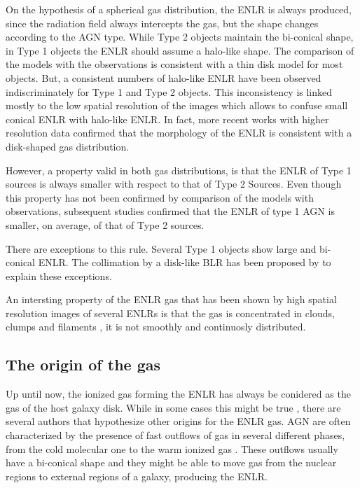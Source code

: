 \documentclass[../main.tex]{subfiles}
\begin{document}
On the hypothesis of a spherical gas distribution, the ENLR is always produced, since the radiation field always intercepts the gas, but the shape changes according to the AGN type.
While Type 2 objects maintain the bi-conical shape, in Type 1 objects the ENLR should assume a halo-like shape.
The comparison of the models with the observations is consistent with a thin disk model for most objects.
But, a consistent numbers of halo-like ENLR have been observed indiscriminately for Type 1 and Type 2 objects.
This inconsistency is linked mostly to the low spatial resolution of the images which allows to confuse small conical ENLR with halo-like ENLR.
In fact, more recent works with higher resolution data \citep[e.g.][]{Schmitt03,Schmitt03b,Fischer13} confirmed that the morphology of the ENLR is consistent with a disk-shaped gas distribution.

However, a property valid in both gas distributions, is that the ENLR of Type 1 sources is always smaller with respect to that of Type 2 Sources.
Even though this property has not been confirmed by \citet{Mulchaey96b} comparison of the models with observations, subsequent studies \citep[e.g.][]{Schmitt03b} confirmed that the ENLR of type 1 AGN is smaller, on average, of that of Type 2 sources.

There are exceptions to this rule.
Several Type 1 objects \citep[e.g. NGC 4151][]{Pogge89,Evans93} show large and bi-conical ENLR.
The collimation by a disk-like BLR has been proposed by \citet{Evans93} to explain these exceptions.

An intersting property of the ENLR gas that has been shown by high spatial resolution images of several ENLRs is that the gas is concentrated in clouds, clumps and filaments \citep[e.g.][]{Tadhunter89,Mulchaey96a,Mulchaey96b,Schmitt03,Schmitt03b}, it is not smoothly and continuosly distributed.

\subsection{The origin of the gas}

Up until now, the ionized gas forming the ENLR has always be conidered as the gas of the host galaxy disk.
While in some cases this might be true \citep[e.g.][]{Fischer17}, there are several authors that hypothesize other origins for the ENLR gas.
AGN are often characterized by the presence of fast outflows of gas in several different phases, from the cold molecular one to the warm ionized gas \citep{Baldwin87,Hutchings98,Crenshaw00,Crenshaw00b,Dasyra15,Morganti15,Morganti18}.
These outflows usually have a bi-conical shape \citep{Pogge88,Schmitt94,Fischer13} and they might be able to move gas from the nuclear regions to external regions of a galaxy, producing the ENLR.
\end{document}
